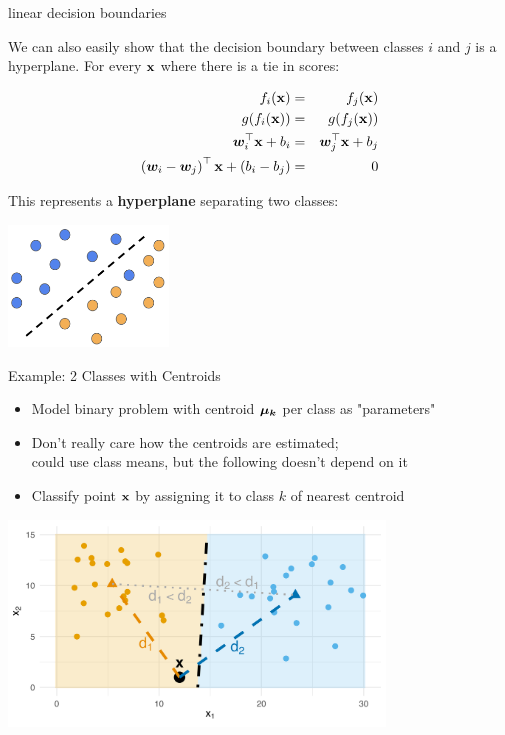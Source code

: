 \documentclass[11pt,compress,t,notes=noshow, xcolor=table]{beamer}
\begin{document}
  
\begin{vbframe}{linear decision boundaries}
  
We can also easily show that the decision boundary between classes $i$ and $j$ is a hyperplane. For every $\xv$ where there is a tie in scores: 

\begin{eqnarray*}
  \fkx[i] &=& \fkx[j] \\
  g(\fkx[i]) &=& g(\fkx[j]) \\
  \bm{w}_i^\top \xv + b_i &=& \bm{w}_j^\top \xv + b_j \\
  \left(\bm{w}_i - \bm{w}_j\right)^\top \xv + \left(b_i - b_j\right) &=& 0 
\end{eqnarray*}

This represents a \textbf{hyperplane} separating two classes:

\begin{center}
\includegraphics[width=0.32\textwidth]{figure_man/linear_boundary.png} 
\end{center}
\end{vbframe}

\begin{vbframe}{Example: 2 Classes with Centroids}

\begin{itemize}
\item Model binary problem with centroid $\muk$ per class as "parameters"

\item  Don't really care how the centroids are estimated; \\
could use class means, but the following doesn't depend on it

\item Classify point $\xv$ by assigning it to class $k$ of nearest centroid

\end{itemize}


\begin{center}
\includegraphics[width=0.75\textwidth]{figure/nearest_centroid_classifier.png} 
\end{center}

\end{vbframe}
\end{document}

